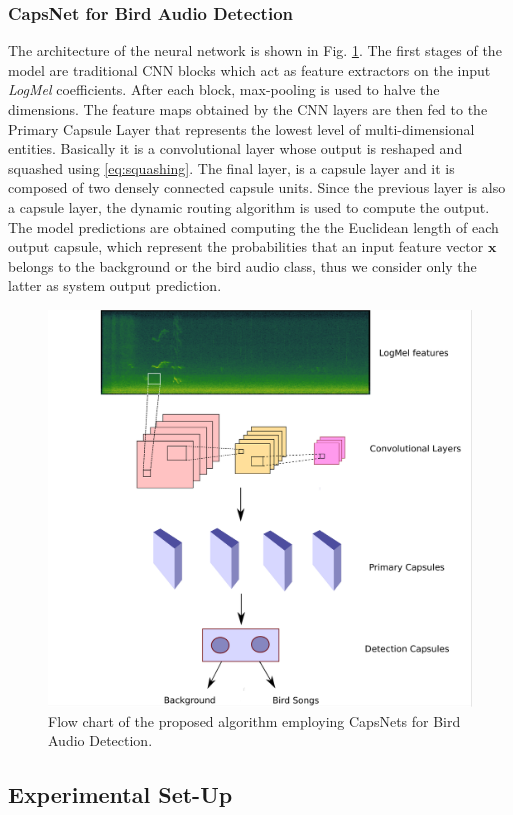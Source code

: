 \subsubsection{CapsNet for Bird Audio Detection}
The architecture of the neural network is shown in Fig. \ref{fig:flowchart_capsule_bad}. The first stages of the model are traditional CNN blocks which act as feature extractors on the input \textit{LogMel} coefficients.
After each block, max-pooling is used to halve the dimensions. The feature maps obtained by the CNN layers are then fed to the Primary Capsule Layer that represents the lowest level of multi-dimensional entities. Basically it is a convolutional layer whose output is reshaped and squashed using \eqref{eq:squashing}. The final layer, is a capsule layer and it is composed of two densely connected capsule units.
Since the previous layer is also a capsule layer, the dynamic routing algorithm is used to compute the output. The model predictions are obtained computing the the Euclidean length of each
output capsule, which represent the probabilities that an input feature vector $\mathbf{x}$ belongs to the background or the bird audio class, thus we consider only the latter as system output prediction.

\begin{figure}[htbp]
	\centering
	\includegraphics[width=0.6\columnwidth]{img/capsule_for_bad}
	\caption[CapsNet for Bird Audio Detection]{Flow chart of the proposed algorithm employing CapsNets for Bird Audio Detection.}
	\label{fig:flowchart_capsule_bad}
\end{figure}

\subsection{Experimental Set-Up}
\label{sec:experiment}

